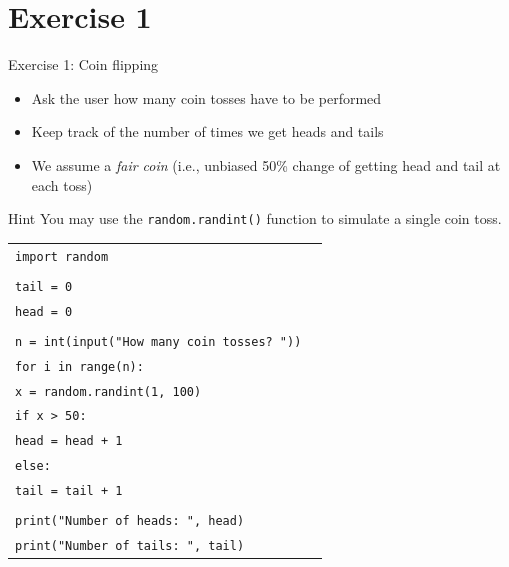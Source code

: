 \documentclass[t,handout,9pt]{beamer}
\begin{document}
\section{Exercise 1}
\begin{frame}{Exercise 1: Coin flipping}
\vfill
\begin{itemize}
	\item Ask the user how many coin tosses have to be performed
	\item Keep track of the number of times we get heads and tails
	\item We assume a \textit{fair coin} (i.e., unbiased 50\% change of getting head and tail at each toss)
\end{itemize}
\begin{block}{Hint}
You may use the \texttt{random.randint()} function to simulate a single coin toss.
\end{block}
\vfill
\end{frame}
%
\begin{frame}
\vfill
	\begin{table}[]
	  \begin{flushleft}
	  \begin{tabular}{ll}
	  \texttt{import random} &  \\
	  \texttt{} &  \\
	  \texttt{tail = 0} &  \\
	  \texttt{head = 0}        & \\
	  \texttt{} &  \\
	  \texttt{n = int(input("How many coin tosses? "))} &  \\
	  \texttt{for i in range(n):}        & \\
	  \texttt{\quad x = random.randint(1, 100)}        & \\
	  \texttt{\quad if x > 50:}        & \\
	  \texttt{\quad\quad head = head + 1}        & \\
	  \texttt{\quad else:}        & \\
	  \texttt{\quad\quad tail = tail + 1}        & \\
	  \texttt{} &  \\
	  \texttt{print("Number of heads: ", head)} &  \\
	  \texttt{print("Number of tails: ", tail)} &  \\
	  \end{tabular}
	  \end{flushleft}
	\end{table}
\vfill
\end{frame}
\end{document}
